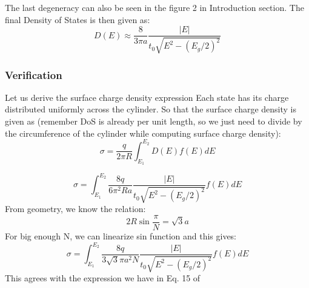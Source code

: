 \documentclass{article}
\begin{document}
The last degeneracy can also be seen in the figure 2 in Introduction section.
The final Density of States is then given as:
\begin{equation}
     D(E) \approx \frac{8}{3\pi a}\frac{|E|}{t_0\sqrt{E^2-(E_g/2)^2}}
\end{equation}

\subsubsection{Verification}
Let us derive the surface charge density expression
Each state has its charge distributed uniformly across the cylinder.
So that the surface charge density is given as (remember DoS is already per unit length, 
so we just need to divide by the circumference of the cylinder while computing surface charge 
density):
\begin{equation}
    \sigma = \frac{q}{2\pi R}\int_{E_1}^{E_2} D(E)f(E)dE
\end{equation}

\begin{equation}
    \sigma = \int_{E_1}^{E_2} \frac{8q}{6\pi^2 R a}\frac{|E|}{t_0\sqrt{E^2-(E_g/2)^2}}f(E)dE
\end{equation}
From geometry, we know the relation:
\begin{equation}
    2R\sin\frac{\pi}{N} = \sqrt{3}a
\end{equation}
For big enough N, we can linearize sin function and this gives:
\begin{equation}
    \sigma = \int_{E_1}^{E_2} \frac{8q}{3\sqrt{3}\pi  a^2 N}\frac{|E|}{t_0\sqrt{E^2-(E_g/2)^2}}f(E)dE
\end{equation}
This agrees with the expression we have in Eq. 15 of ~\cite{leonardPropertiesShortChannel2006} 



\end{document}
